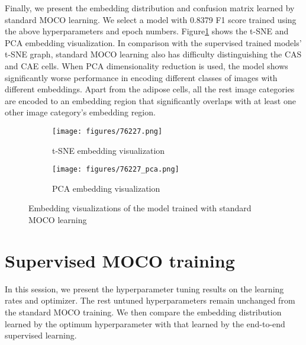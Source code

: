 \documentclass[12pt,twoside]{report}
\begin{document}
Finally, we present the embedding distribution and confusion matrix learned by standard MOCO learning. We select a model with 0.8379 F1 score trained using the above hyperparameters and epoch numbers. Figure\ref{fig:moco_embedding} shows the t-SNE and PCA embedding visualization. In comparison with the supervised trained models' t-SNE graph, standard MOCO learning also has difficulty distinguishing the CAS and CAE cells. When PCA dimensionality reduction is used, the model shows significantly worse performance in encoding different classes of images with different embeddings. Apart from the adipose cells, all the rest image categories are encoded to an embedding region that significantly overlaps with at least one other image category's embedding region. \\

\begin{figure}
\centering
    \begin{subfigure}{.45\textwidth}
      \centering
      \texttt{[image: figures/76227.png]}
      \caption{t-SNE embedding visualization}
    \end{subfigure}%
    \begin{subfigure}{.45\textwidth}
      \centering
      \texttt{[image: figures/76227\_pca.png]}
      \caption{PCA embedding visualization}
    \end{subfigure}
    \caption{Embedding visualizations of the model trained with standard MOCO learning}
    \label{fig:moco_embedding}
\end{figure}



\section{Supervised MOCO training} \label{sec:supervisedMOCO_eval}
In this session, we present the hyperparameter tuning results on the learning rates and optimizer. The rest untuned hyperparameters remain unchanged from the standard MOCO training. We then compare the embedding distribution learned by the optimum hyperparameter with that learned by the end-to-end supervised learning.\\
\end{document}
